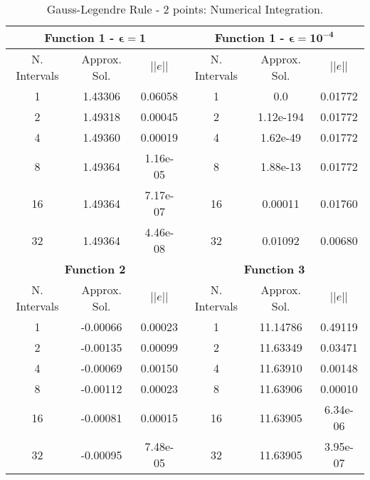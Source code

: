 \begin{table}[H]
    \centering
    \caption{Gauss-Legendre Rule - 2 points: Numerical Integration.}
    \label{tab:gauss2_int}
    \begin{tabular}{ccc|ccc}
    \hline
    \multicolumn{3}{c}{\textbf{Function 1  -} $\bm{\epsilon = 1}$} & \multicolumn{3}{c}{\textbf{Function 1 -} $\bm{\epsilon = 10^{-4}}$} \\ \hline
    N. Intervals & Approx. Sol. & $|| e ||$ & N. Intervals & Approx. Sol. & $|| e ||$ \\ \hline
    1 & 1.43306 & 0.06058 & 1 & 0.0 & 0.01772 \\ 
    2 & 1.49318 & 0.00045 & 2 & 1.12e-194 & 0.01772 \\
    4 & 1.49360 & 0.00019 & 4 & 1.62e-49 & 0.01772 \\
    8 & 1.49364 & 1.16e-05 & 8 & 1.88e-13 & 0.01772 \\
    16 & 1.49364 & 7.17e-07 & 16 & 0.00011 & 0.01760 \\
    32 & 1.49364 & 4.46e-08 & 32 & 0.01092 & 0.00680  \\ \hline
    \multicolumn{3}{c}{\textbf{Function 2}} & \multicolumn{3}{c}{\bf{Function 3}} \\ \hline
    N. Intervals & Approx. Sol. & $|| e ||$ & N. Intervals & Approx. Sol. & $|| e ||$ \\ \hline
    1 & -0.00066 & 0.00023 & 1 & 11.14786 & 0.49119 \\
    2 & -0.00135 & 0.00099 & 2 & 11.63349 & 0.03471 \\
    4 & -0.00069 & 0.00150 & 4 & 11.63910 & 0.00148 \\
    8 & -0.00112 & 0.00023 & 8 & 11.63906 & 0.00010 \\
    16 & -0.00081 & 0.00015 & 16 & 11.63905 & 6.34e-06 \\
    32 & -0.00095 & 7.48e-05 & 32 & 11.63905 & 3.95e-07 \\ \hline
    \end{tabular}
\end{table}
